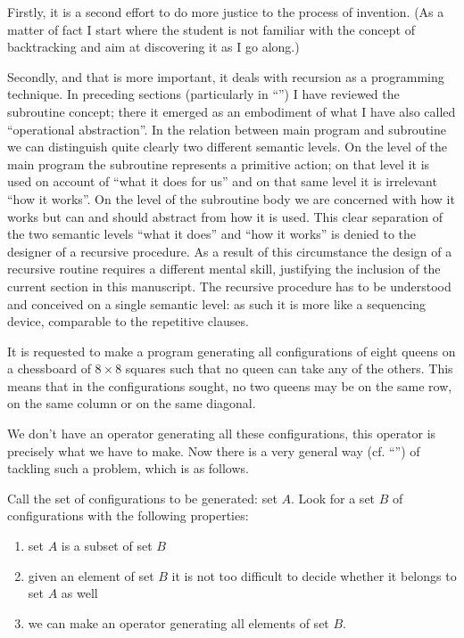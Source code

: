 Firstly, it is a second effort to do more justice to the process of invention. (As a matter of fact I start where the student is not familiar with the concept of backtracking and aim at discovering it as I go along.)

Secondly, and that is more important, it deals with recursion as a programming technique. In preceding sections (particularly in ``'') I have reviewed the subroutine concept; there it emerged as an embodiment of what I have also called ``operational abstraction''. In the relation between main program and subroutine we can distinguish quite clearly two different semantic levels. On the level of the main program the subroutine represents a primitive action; on that level it is used on account of ``what it does for us'' and on that same level it is irrelevant ``how it works''. On the level of the subroutine body we are concerned with how it works but can \textemdash{}  and should \textemdash{}  abstract from how it is used. This clear separation of the two semantic levels ``what it does'' and ``how it works'' is denied to the designer of a recursive procedure. As a result of this circumstance the design of a recursive routine requires a different mental skill, justifying the inclusion of the current section in this manuscript. The recursive procedure has to be understood and conceived on a single semantic level: as such it is more like a sequencing device, comparable to the repetitive clauses.

It is requested to make a program generating all configurations of eight queens on a chessboard of $8\times 8$ squares such that no queen can take any of the others. This means that in the configurations sought, no two queens may be on the same row, on the same column or on the same diagonal.

We don't have an operator generating all these configurations, this operator is precisely what we have to make. Now there is a very general way (cf. ``'') of tackling such a problem, which is as follows.

Call the set of configurations to be generated: set $A$. Look for a set $B$ of configurations with the following properties:

\begin{enumerate}[wide, nosep, label=(\arabic*)]
	\item \label{en:first-item-eight-queen}
	set $A$ is a subset of set $B$
	
	\item \label{en:second-item-eight-queen}
	given an element of set $B$ it is not too difficult to decide whether it belongs to set $A$ as well
	
	\item \label{en:third-item-eight-queen}
	we can make an operator generating all elements of set $B$. 
\end{enumerate}

